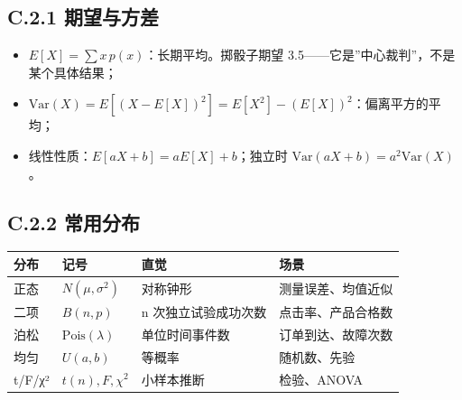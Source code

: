\subsection{C.2.1
期望与方差}\label{c.2.1-ux671fux671bux4e0eux65b9ux5dee}

\begin{itemize}
\tightlist
\item
  \(E[X]=\sum x\,p(x)\)：长期平均。掷骰子期望
  3.5------它是''中心裁判''，不是某个具体结果；
\item
  \(\mathrm{Var}(X)=E[(X-E[X])^2]=E[X^2]-(E[X])^2\)：偏离平方的平均；
\item
  线性性质：\(E[aX+b]=aE[X]+b\)；独立时
  \(\mathrm{Var}(aX+b)=a^2\mathrm{Var}(X)\)。
\end{itemize}

\subsection{C.2.2 常用分布}\label{c.2.2-ux5e38ux7528ux5206ux5e03}

{\def\LTcaptype{none} %
\begin{longtable}[]{@{}
  >{\raggedright\arraybackslash}p{}
  >{\raggedright\arraybackslash}p{}
  >{\raggedright\arraybackslash}p{}
  >{\raggedright\arraybackslash}p{}@{}}
\toprule\noalign{}
\begin{minipage}[b]{\linewidth}\raggedright
分布
\end{minipage} & \begin{minipage}[b]{\linewidth}\raggedright
记号
\end{minipage} & \begin{minipage}[b]{\linewidth}\raggedright
直觉
\end{minipage} & \begin{minipage}[b]{\linewidth}\raggedright
场景
\end{minipage} \\
\midrule\noalign{}
\endhead
\bottomrule\noalign{}
\endlastfoot
正态 & \(N(\mu,\sigma^2)\) & 对称钟形 & 测量误差、均值近似 \\
二项 & \(B(n,p)\) & n 次独立试验成功次数 & 点击率、产品合格数 \\
泊松 & \(\mathrm{Pois}(\lambda)\) & 单位时间事件数 &
订单到达、故障次数 \\
均匀 & \(U(a,b)\) & 等概率 & 随机数、先验 \\
t/F/χ² & \(t(n), F, \chi^2\) & 小样本推断 & 检验、ANOVA \\
\end{longtable}
}

